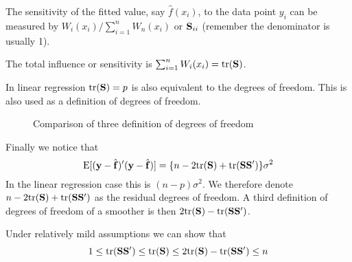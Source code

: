 The sensitivity of the fitted value, say $\hat{f}(x_i)$, to the data
point $y_i$ can be
measured by $W_i(x_i)/\sum_{i=1}^n W_n(x_i)$ or ${\mathbf S}_{ii}$ (remember
the denominator is usually 1).

The total influence or sensitivity is $\sum_{i=1}^n W_i(x_i) =
\mbox{tr}({\mathbf S})$.

In linear regression $\mbox{tr}({\mathbf S})=p$ is also equivalent to the degrees of
freedom. This is also used as a definition of degrees of freedom.





\begin{figure}[htb]
\caption{Comparison of three definition of degrees of freedom}
\begin{center}
\end{center}
\end{figure}


Finally we notice that 
\[
\mbox{E}[ ({\mathbf y} - \hat{{\mathbf f}})'({\mathbf y} - \hat{{\mathbf f}}) ] = \{n - 2\mbox{tr}({\mathbf S}) +
\mbox{tr}({\mathbf S}{\mathbf S}')\}\sigma^2
\]
In the linear regression case this is $(n-p)\sigma^2$. We therefore denote 
$n - 2\mbox{tr}({\mathbf S}) + \mbox{tr}({\mathbf S}{\mathbf S}')$ as the residual degrees of freedom. A
third definition of degrees of freedom of a smoother is then
$2\mbox{tr}({\mathbf S}) - \mbox{tr}({\mathbf S}{\mathbf S}')$.

Under relatively mild assumptions we can show that 
\[
1 \leq \mbox{tr}({\mathbf S}{\mathbf S}') \leq \mbox{tr}({\mathbf S}) \leq 2\mbox{tr}({\mathbf S}) - \mbox{tr}({\mathbf S}{\mathbf S}') \leq n
\]


